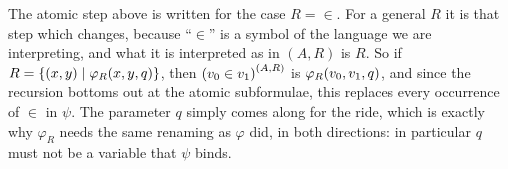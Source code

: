The atomic step above is written for the case $R = \in$. For a general $R$ it is that step which changes, because ``$\in$'' is a symbol of the language we are interpreting, and what it is interpreted as in $(A, R)$ is $R$. So if $R = \left\{ (x, y) \; \middle\vert \; \varphi_R\!\left( x, y, q \right) \right\}$, then $\left( v_0 \in v_1 \right)^{(A, R)}$ is $\varphi_R\!\left( v_0, v_1, q \right)$, and since the recursion bottoms out at the atomic subformulae, this replaces every occurrence of $\in$ in $\psi$. The parameter $q$ simply comes along for the ride, which is exactly why $\varphi_R$ needs the same renaming as $\varphi$ did, in both directions: in particular $q$ must not be a variable that $\psi$ binds.
